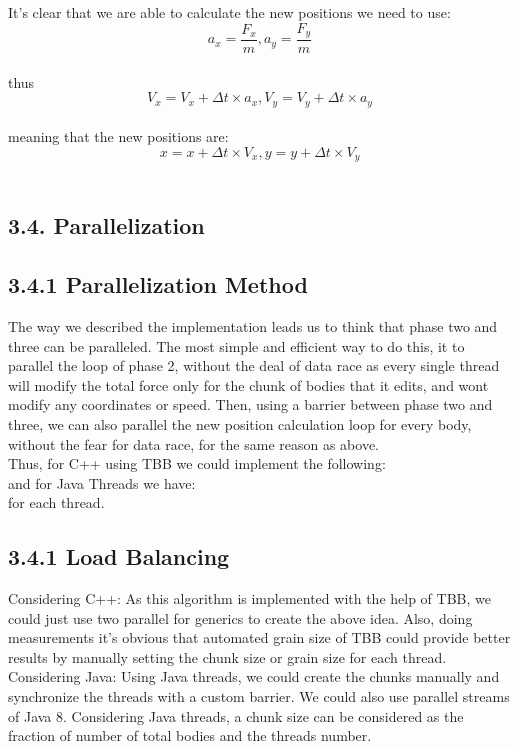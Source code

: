 \documentclass{article}
\begin{document}
It's clear that we are able to calculate the new positions we need to use: \\
\[a_x = \frac{F_x}{m}, a_y = \frac{F_y}{m}\]\\
thus \\
\[V_x = V_x + \Delta t\times a_x, V_y = V_y + \Delta t \times a_y\]\\
meaning that the new positions are: \\
\[x = x + \Delta t \times V_x, y = y + \Delta t \times V_y\]\\



\subsection*{3.4. Parallelization}

\subsection*{3.4.1 Parallelization Method}
The way we described the implementation leads us to think that phase two and three can be paralleled. The most simple and efficient way to do this, it to parallel the loop of phase 2, without the deal of data race as every single thread will modify the total force only for the chunk of bodies that it edits, and wont modify any coordinates or speed. Then, using a barrier between phase two and three, we can also parallel the new position calculation loop for every body, without the fear for data race, for the same reason as above. \\
Thus, for C++ using TBB we could implement the following: \\

and for Java Threads we have: \\

for each thread.
\subsection*{3.4.1 Load Balancing}
Considering C++: As this algorithm is implemented with the help of TBB, we could just use two parallel for generics to create the above idea. Also, doing measurements it's obvious that automated grain size of TBB could provide better results by manually setting the chunk size or grain size for each thread.\\
Considering Java: Using Java threads, we could create the chunks manually and synchronize the threads with a custom barrier. We could also use parallel streams of Java 8. Considering Java threads, a chunk size can be considered as the fraction of number of total bodies and the threads number.\\
\end{document}
